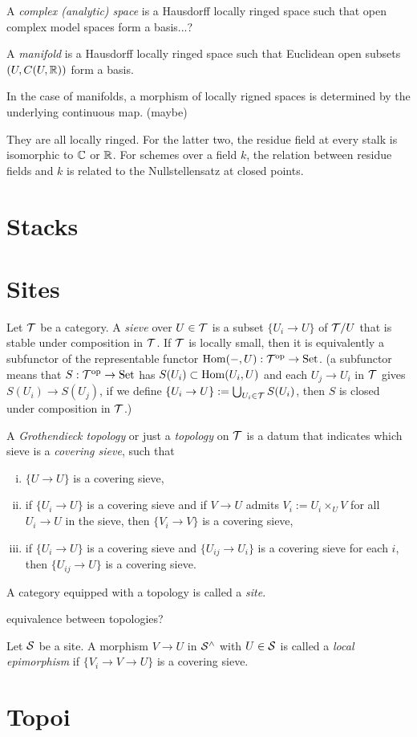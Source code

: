 \documentclass{../../large}
\begin{document}
A \emph{complex (analytic) space} is a Hausdorff locally ringed space such that open complex model spaces form a basis...?

A \emph{manifold} is a Hausdorff locally ringed space such that Euclidean open subsets $(U,C(U,\mathbb{R}))$ form a basis.



In the case of manifolds, a morphism of locally rigned spaces is determined by the underlying continuous map. (maybe)

They are all locally ringed.
For the latter two, the residue field at every stalk is isomorphic to $\mathbb{C}$ or $\mathbb{R}$.
For schemes over a field $k$, the relation between residue fields and $k$ is related to the Nullstellensatz at closed points.


\section{}


\chapter{Stacks}



\chapter{Sites}

\begin{prb}
Let $\mathcal{T}$ be a category.
A \emph{sieve} over $U\in\mathcal{T}$ is a subset $\{U_i\to U\}$ of $\mathcal{T}/U$ that is stable under composition in $\mathcal{T}$.
If $\mathcal{T}$ is locally small, then it is equivalently a subfunctor of the representable functor $\operatorname{Hom}(-,U):\mathcal{T}^{\mathrm{op}}\to\mathrm{Set}$.
(a subfunctor means that $S:\mathcal{T}^{\mathrm{op}}\to\mathrm{Set}$ has $S(U_i)\subset\operatorname{Hom}(U_i,U)$ and each $U_j\to U_i$ in $\mathcal{T}$ gives $S(U_i)\to S(U_j)$, if we define $\{U_i\to U\}:=\bigcup_{U_i\in\mathcal{T}}S(U_i)$, then $S$ is closed under composition in $\mathcal{T}$.)

A \emph{Grothendieck topology} or just a \emph{topology} on $\mathcal{T}$ is a datum that indicates which sieve is a \emph{covering sieve}, such that
\begin{enumerate}[(i)]
\item $\{U\to U\}$ is a covering sieve,
\item if $\{U_i\to U\}$ is a covering sieve and if $V\to U$ admits $V_i:=U_i\times_UV$ for all $U_i\to U$ in the sieve, then $\{V_i\to V\}$ is a covering sieve,
\item if $\{U_i\to U\}$ is a covering sieve and $\{U_{ij}\to U_i\}$ is a covering sieve for each $i$, then $\{U_{ij}\to U\}$ is a covering sieve.
\end{enumerate}

A category equipped with a topology is called a \emph{site}.

equivalence between topologies?
\end{prb}

\begin{prb}
Let $\mathcal{S}$ be a site.
A morphism $V\to U$ in $\mathcal{S}^\wedge$ with $U\in\mathcal{S}$ is called a \emph{local epimorphism} if $\{V_i\to V\to U\}$ is a covering sieve.

\end{prb}

\chapter{Topoi}
\end{document}

